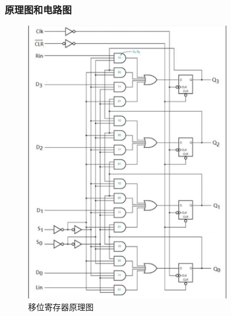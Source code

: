 \documentclass{article}
\begin{document}
    \subsubsection{原理图和电路图}
    \begin{figure}[H]
    \centering
    \includegraphics[width=0.8\textwidth]{3.4.1.png}
    \caption{移位寄存器原理图}
    \end{figure}    
\end{document}
